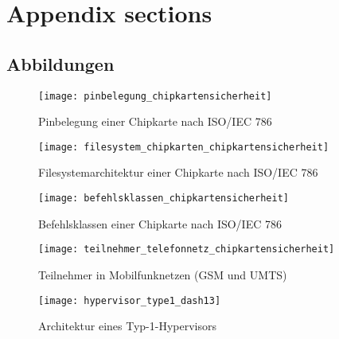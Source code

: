 \section{Appendix sections}
\subsection{Abbildungen}
 \begin{figure}[htp]
  \begin{center}
   \texttt{[image: pinbelegung\_chipkartensicherheit]}
  \end{center}
  \caption[Pinbelegung einer Chipkarte]{Pinbelegung einer Chipkarte nach ISO/IEC 786 \cite{spitz11}}
  \label{abb:pinbelegung_chipkarten}
 \end{figure}

 \begin{figure}[htp]
  \begin{center}
   \texttt{[image: filesystem\_chipkarten\_chipkartensicherheit]}
  \end{center}
  \caption[Filesystemarchitektur einer Chipkarte]{Filesystemarchitektur einer Chipkarte nach ISO/IEC 786 \cite{spitz11}}
  \label{abb:filesystem_chipkarten}
 \end{figure}

  \begin{figure}[htp]
  \begin{center}
   \texttt{[image: befehlsklassen\_chipkartensicherheit]}
  \end{center}
  \caption[Befehlsklassen einer Chipkarte]{Befehlsklassen einer Chipkarte nach ISO/IEC 786 \cite{spitz11}}
  \label{abb:befehlsklassen_chipkarten}
 \end{figure}

  \begin{figure}[htp]
  \begin{center}
   \texttt{[image: teilnehmer\_telefonnetz\_chipkartensicherheit]}
  \end{center}
  \caption[Teilnehmer in Mobilfunknetzen]{Teilnehmer in Mobilfunknetzen (GSM und UMTS) \cite{spitz11}}
  \label{abb:teilnehmer_telefonnetz}
 \end{figure}

  \begin{figure}[htp]
  \begin{center}
   \texttt{[image: hypervisor\_type1\_dash13]}
  \end{center}
  \caption[Architektur eines Typ-1-Hypervisors]{Architektur eines Typ-1-Hypervisors \cite{dash13}}
  \label{abb:hypervisor_type1}
 \end{figure}

